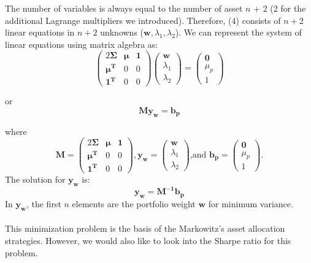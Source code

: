 \documentclass[12pt,titlepage,a4paper]{article}
\begin{document}
The number of variables is always equal to the number of asset $n$ + 2 (2 for the additional Lagrange multipliers we introduced). Therefore, (4) consists of $n+2$ linear equations in $n+2$ unknowns ($\mathbf{w}, \lambda_1, \lambda_2$). We can represent the system of linear equations using matrix algebra as: 
\begin{equation*}
\begin{pmatrix} 2\mathbf{\Sigma} & \mathbf{\mu} & \mathbf{1} \\ \mathbf{\mu^T} & 0 & 0 \\ \mathbf{1^T} & 0 & 0 \end{pmatrix} 
\begin{pmatrix}
\mathbf{w} \\ \lambda_1 \\ \lambda_2
\end{pmatrix}
 = 
\begin{pmatrix}
\mathbf{0} \\ \mu_p \\ 1
\end{pmatrix}
\end{equation*}

or 
$$
\mathbf{My_w} = \mathbf{b_p}
$$

where
\begin{equation*}
\mathbf{M} = \begin{pmatrix} 2\mathbf{\Sigma} & \mathbf{\mu} & \mathbf{1} \\ \mathbf{\mu^T} & 0 & 0 \\ \mathbf{1^T} & 0 & 0 \end{pmatrix}, 
\mathbf{y_w}=\begin{pmatrix}
\mathbf{w} \\ \lambda_1 \\ \lambda_2
\end{pmatrix} \text{,and }
\mathbf{b_p} = \begin{pmatrix}
\mathbf{0} \\ \mu_p \\ 1
\end{pmatrix}.
\end{equation*}
The solution for $\mathbf{y_w}$ is: 
\begin{equation}
\mathbf{y_w} = \mathbf{M^{-1}b_p}
\end{equation}
In $\mathbf{y_w}$, the first $n$ elements are the portfolio weight $\mathbf{w}$ for minimum variance. \\ \\
This minimization problem is the basis of the Markowitz's asset allocation strategies. However, we would also like to look into the Sharpe ratio for this problem. \\
\end{document}
